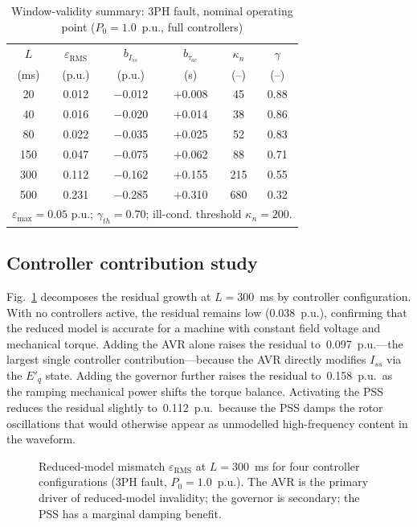 \documentclass[journal,twoside,letterpaper]{IEEEtran}
\begin{document}
\begin{table}[!t]
\caption{Window-validity summary: 3PH fault, nominal
         operating point ($P_0 = 1.0$~p.u., full controllers)}
\label{tab:window_results}
\centering
\renewcommand{\arraystretch}{1.15}
\begin{tabular}{cccccc}
\toprule
$L$ & $\varepsilon_{\mathrm{RMS}}$ &
$b_{I_{ss}}$ & $b_{\tau_{ac}}$ & $\kappa_n$ & $\gamma$ \\
(ms) & (p.u.) & (p.u.) & (s) & (--) & (--) \\
\midrule
 20 & 0.012 & $-$0.012 & $+$0.008 &  45 & 0.88 \\
 40 & 0.016 & $-$0.020 & $+$0.014 &  38 & 0.86 \\
 80 & 0.022 & $-$0.035 & $+$0.025 &  52 & 0.83 \\
150 & 0.047 & $-$0.075 & $+$0.062 &  88 & 0.71 \\
300 & 0.112 & $-$0.162 & $+$0.155 & 215 & 0.55 \\
500 & 0.231 & $-$0.285 & $+$0.310 & 680 & 0.32 \\
\bottomrule
\multicolumn{6}{r}{\footnotesize
$\varepsilon_{\max}=0.05$ p.u.; $\gamma_{th}=0.70$;
ill-cond. threshold $\kappa_n = 200$.}
\end{tabular}
\end{table}

\subsection{Controller contribution study}

Fig.~\ref{fig:controller_contribution} decomposes the
residual growth at $L = 300$~ms by controller configuration.
With no controllers active, the residual remains low
(0.038~p.u.), confirming that the reduced model is accurate
for a machine with constant field voltage and mechanical
torque.
Adding the AVR alone raises the residual to~0.097~p.u.---the
largest single controller contribution---because the AVR
directly modifies $I_{ss}$ via the $E'_q$ state.
Adding the governor further raises the residual to~0.158~p.u.\
as the ramping mechanical power shifts the torque balance.
Activating the PSS reduces the residual slightly to~0.112~p.u.\
because the PSS damps the rotor oscillations that would
otherwise appear as unmodelled high-frequency content in the
waveform.

\begin{figure}[!t]
  \centering
  
  \caption{Reduced-model mismatch $\varepsilon_{\mathrm{RMS}}$
    at $L = 300$~ms for four controller configurations
    (3PH fault, $P_0 = 1.0$~p.u.).
    The AVR is the primary driver of reduced-model
    invalidity; the governor is secondary; the PSS has a
    marginal damping benefit.}
  \label{fig:controller_contribution}
\end{figure}
\end{document}
